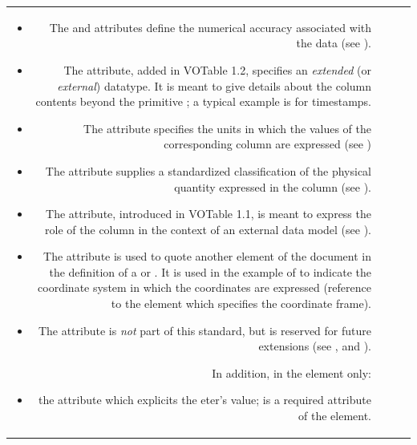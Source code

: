 \begin{tabular}{RRCp{0.8\textwidth}}
\begin{center}
\begin{itemize}
\item   {}The  and  attributes define the 
        numerical accuracy associated with the data 
        (see ).

\item	The  attribute, added in VOTable 1.2, specifies an
	{\em extended} (or {\em external}) datatype. It is meant
	to give details about the column contents beyond the 
	primitive 
	{; a typical example is 
	 for timestamps.}

\item   The  attribute specifies the units in which
        the values of the corresponding column are expressed
        (see )

\item   The  attribute supplies a standardized classification
        of the physical quantity expressed in the column
        (see ).

\item   The  attribute, introduced in VOTable 1.1, is meant
        to express the role of the column in the context of an external
        data model (see ).

\item   The  attribute is used to quote another element of
        the document in the definition of a  or . 
        It is used in the example of  
        to indicate the coordinate system in which the coordinates 
        are expressed
        (reference to the  element which specifies the
        coordinate frame).

\item   The  attribute is {\em not} part of this standard,
        but is reserved for future extensions (see 
        ,
         and 
        ).

\end{itemize}

In addition, in the  element only:
\begin{itemize}
\item   the  attribute which explicits the eter's
        value;  is a required attribute of the 
        element.
\end{itemize}


\end{center}
\end{tabular}
